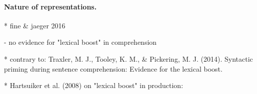 \paragraph{Nature of representations.}



* fine \& jaeger 2016 

- no evidence for "lexical boost" in comprehension



* contrary to: Traxler, M. J., Tooley, K. M., \& Pickering, M. J. (2014). Syntactic priming during sentence comprehension: Evidence for the lexical boost.


* Hartsuiker et al. (2008) on "lexical boost" in production:

